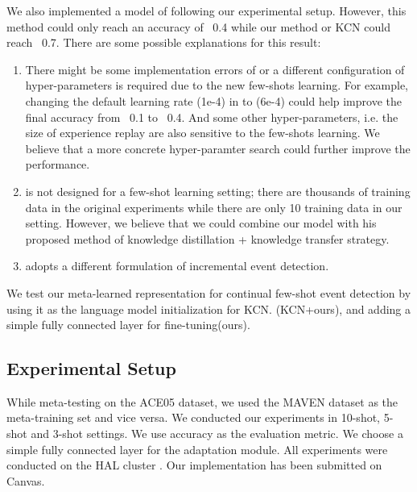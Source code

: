 We also implemented a model of  \cite{yu2021lifelong} following our experimental setup. However, this method could only reach an accuracy of ~0.4 while our method or KCN could reach ~0.7. There are some possible explanations for this result: 
\begin{enumerate}[noitemsep]
\item There might be some implementation errors of  \cite{yu2021lifelong} or a different configuration of hyper-parameters is required due to the new few-shots learning. For example, changing the default learning rate (1e-4)  in  \cite{yu2021lifelong}  to (6e-4) could help improve the final accuracy from ~0.1 to ~0.4. And some other hyper-parameters, i.e. the size of experience replay are also sensitive to the few-shots learning. We believe that a more concrete hyper-paramter search could further improve the performance. 

\item \cite{yu2021lifelong}  is not designed for a few-shot learning setting; there are thousands of  training data in the original experiments while there are only 10 training data in our setting. However, we believe that we could combine our model with his proposed method of knowledge distillation + knowledge transfer strategy. 

\item \cite{yu2021lifelong} adopts a different formulation of incremental event detection.
\end{enumerate}

We test our meta-learned representation for continual few-shot event detection by using it as the language model initialization for KCN. (KCN+ours), and adding a simple fully connected layer for fine-tuning(ours). 

\subsection{Experimental Setup}
While meta-testing on the ACE05 dataset, we used the MAVEN dataset as the meta-training set and vice versa.  We conducted our experiments in 10-shot, 5-shot and 3-shot settings.  We use accuracy as the evaluation metric. We choose a simple fully connected layer for the adaptation module.  All experiments were conducted on the HAL cluster \citep{HAL}. Our implementation has been submitted on Canvas. 

